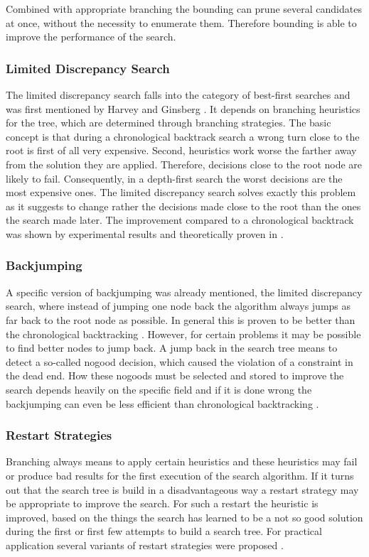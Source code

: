 \documentclass[10pt,
               a4paper,
               journal,
               ]{IEEEtran}
\begin{document}
	Combined with appropriate branching the bounding can prune several candidates at once, without the necessity to enumerate them. Therefore bounding is able to improve the performance of the search.
	
	\subsubsection{Limited Discrepancy Search}
	The limited discrepancy search falls into the category of best-first searches and was first mentioned by Harvey and Ginsberg \cite{limitedDiscrepancy}. It depends on branching heuristics for the tree, which are determined through branching strategies. The basic concept is that during a chronological backtrack search a wrong turn close to the root is first of all very expensive. Second, heuristics work worse the farther away from the solution they are applied. Therefore, decisions close to the root node are likely to fail. Consequently, in a depth-first search the worst decisions are the most expensive ones. The limited discrepancy search solves exactly this problem as it suggests to change rather the decisions made close to the root than the ones the search made later. The improvement compared to a chronological backtrack was shown by experimental results and theoretically proven in \cite{limitedDiscrepancy}.
	
	\subsubsection{Backjumping}
	A specific version of backjumping was already mentioned, the limited discrepancy search, where instead of jumping one node back the algorithm always jumps as far back to the root node as possible. In general this is proven to be better than the chronological backtracking \cite{limitedDiscrepancy}. However, for certain problems it may be possible to find better nodes to jump back. A jump back in the search tree means to detect a so-called nogood decision, which caused the violation of a constraint in the dead end. How these nogoods must be selected and stored to improve the search depends heavily on the specific field and if it is done wrong the backjumping can even be less efficient than chronological backtracking \cite[p.~100]{handbookCP}.
	
	\subsubsection{Restart Strategies}
	Branching always means to apply certain heuristics and these heuristics may fail or produce bad results for the first execution of the search algorithm. If it turns out that the search tree is build in a disadvantageous way a restart strategy may be appropriate to improve the search. For such a restart the heuristic is improved, based on the things the search has learned to be a not so good solution during the first or first few attempts to build a search tree.
	For practical application several variants of restart strategies were proposed \cite[p.~113]{handbookCP}.
	
\end{document}
